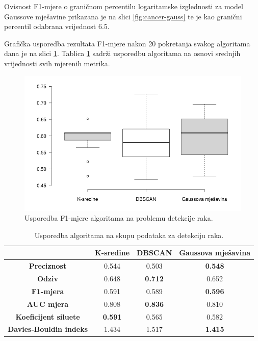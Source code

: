 \documentclass[utf8, diplomski, numeric]{fer}
\begin{document}
Ovisnost F1-mjere o graničnom percentilu logaritamske izglednosti za model Gaussove mješavine prikazana je na slici \ref{fig:cancer-gauss} te je kao granični percentil odabrana vrijednost 6.5.

Grafička usporedba rezultata F1-mjere nakon 20 pokretanja svakog algoritama dana je na slici \ref{fig:cancer-f1}. Tablica \ref{tab:cancer} sadrži usporedbu algoritama na osnovi srednjih vrijednosti svih mjerenih metrika.

\begin{figure}[h!]
\includegraphics[width=1\textwidth]{images/cancer-f1.png}
\centering
\caption{Usporedba F1-mjere algoritama na problemu detekcije raka.}
\label{fig:cancer-f1}
\end{figure}

\begin{table}[h!]
  \begin{center}
    \caption{Usporedba algoritama na skupu podataka za detekciju raka.}
    \label{tab:cancer}
    \begin{tabular}{c|c|c|c} 
      & \textbf{K-sredine} & \textbf{DBSCAN}  & \textbf{Gaussova mješavina}\\
      \hline
      \textbf{Preciznost} & 0.544 & 0.503 & \textbf{0.548} \\
      \textbf{Odziv} & 0.648 & \textbf{0.712} & 0.652 \\
      \textbf{F1-mjera} & 0.591 & 0.589 & \textbf{0.596} \\
      \textbf{AUC mjera} & 0.808 & \textbf{0.836} & 0.810 \\
       \textbf{Koeficijent siluete} & \textbf{0.591} & 0.565 & 0.582 \\
       \textbf{Davies-Bouldin indeks} & 1.434 & 1.517 & \textbf{1.415} \\
     \end{tabular}
  \end{center}
\end{table}
\end{document}
